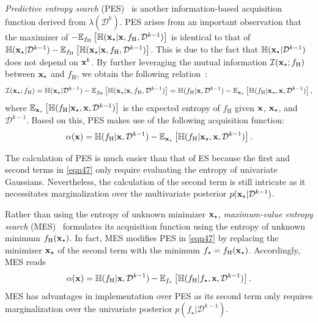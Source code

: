 \documentclass[journal ]{new-aiaa}
\begin{document}
\textit{Predictive entropy search} (PES)~\citep{HernandezLobato2014} is another information-based acquisition function derived from $\lambda(\mathcal{D}^{k})$.
PES arises from an important observation that the maximizer of $-\mathbb{E}_{f_\text{H}}\left[\mathbb{H}({\bf x}_\star|{\bf x},f_\text{H},\mathcal{D}^{k-1})\right]$ is identical to that of $\mathbb{H}({\bf x}_\star|\mathcal{D}^{k-1})-\mathbb{E}_{f_\text{H}}\left[\mathbb{H}({\bf x}_\star|{\bf x},f_\text{H},\mathcal{D}^{k-1})\right]$.
This is due to the fact that $\mathbb{H}({\bf x}_\star|\mathcal{D}^{k-1})$ does not depend on ${\bf x}^k$.
By further leveraging the mutual information $\mathcal{I}({\bf x}_\star;f_\text{H})$ between ${\bf x}_\star$ and $f_\text{H}$, we obtain the following relation~\citep{Houlsby2012}:
\begin{equation}\label{eqn46}
		 \mathcal{I}({\bf x}_\star;f_\text{H})
		= \mathbb{H}({\bf x}_\star|\mathcal{D}^{k-1})-\mathbb{E}_{f_\text{H}}\left[\mathbb{H}({\bf x}_\star|{\bf x},f_\text{H},\mathcal{D}^{k-1})\right]
		 = \mathbb{H}(f_\text{H}|{\bf x},\mathcal{D}^{k-1})-\mathbb{E}_{{\bf x}_\star}\left[\mathbb{H}(f_\text{H}|{\bf x}_\star,{\bf x},\mathcal{D}^{k-1})\right],
\end{equation}
where $\mathbb{E}_{{\bf x}_\star}\left[\mathbb{H}(f_\text{H}|{\bf x}_\star,{\bf x},\mathcal{D}^{k-1})\right]$ is the expected entropy of $f_\text{H}$ given ${\bf x}$, ${\bf x}_\star$, and $\mathcal{D}^{k-1}$.
Based on this, PES makes use of the following acquisition function:
\begin{equation}\label{eqn47}
		\alpha({\bf x}) 
		= \mathbb{H}(f_\text{H}|{\bf x},\mathcal{D}^{k-1})-\mathbb{E}_{{\bf x}_\star}\left[\mathbb{H}(f_\text{H}|{\bf x}_\star,{\bf x},\mathcal{D}^{k-1})\right].
\end{equation}

The calculation of PES is much easier than that of ES because the first and second terms in \cref{eqn47} only require evaluating the entropy of univariate Gaussians.
Nevertheless, the calculation of the second term is still intricate as it necessitates marginalization over the multivariate posterior $p({\bf x}_\star|\mathcal{D}^{k-1})$.

Rather than using the entropy of unknown minimizer ${\bf x}_\star$, \textit{maximum-value entropy search} (MES)~\citep{WangZ2017} formulates its acquisition function using the entropy of unknown minimum $f_\text{H}({\bf x}_\star)$.
In fact, MES modifies PES in \cref{eqn47} by replacing the minimizer ${\bf x}_\star$ of the second term with the minimum $f_\star = f_\text{H}({\bf x}_\star)$.
Accordingly, MES reads
\begin{equation}\label{eqn48}
	\alpha({\bf x})
	= \mathbb{H}(f_\text{H}|{\bf x},\mathcal{D}^{k-1})-\mathbb{E}_{f_\star }\left[\mathbb{H}(f_\text{H}|f_\star ,{\bf x},\mathcal{D}^{k-1})\right].
\end{equation}
MES has advantages
in implementation over PES as its second term only requires marginalization over the univariate posterior $p(f_\star|\mathcal{D}^{k-1})$.
\end{document}
